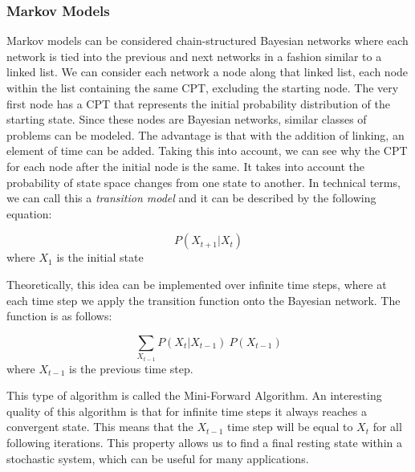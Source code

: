 \subsubsection{Markov Models}
Markov models can be considered chain-structured Bayesian networks where each network is tied into the previous and next networks in a fashion similar to a linked list. We can consider each network a node along that linked list, each node within the list containing the same CPT, excluding the starting node. The very first node has a CPT that represents the initial probability distribution of the starting state. Since these nodes are Bayesian networks, similar classes of problems can be modeled. The advantage is that with the addition of linking, an element of time can be added. Taking this into account, we can see why the CPT for each node after the initial node is the same. It takes into account the probability of state space changes from one state to another. In technical terms, we can call this a \textit{transition model} and it can be described by the following equation:\par

\vspace{-32px}
\begin{center}
  \begin{equation}
    P(X_{t+1}|X_{t})
  \end{equation}
  where $X_{1}$ is the initial state
\end{center}

Theoretically, this idea can be implemented over infinite time steps, where at each time step we apply the transition function onto the Bayesian network. The function is as follows:\par

\vspace{-32px}
\begin{center}
  \begin{equation}
    \sum_{X_{t-1}} P(X_{t}|X_{t-1})\:P(X_{t-1})
  \end{equation}
  where $X_{t-1}$ is the previous time step.
\end{center}

This type of algorithm is called the Mini-Forward Algorithm. An interesting quality of this algorithm is that for infinite time steps it always reaches a convergent state. This means that the $X_{t-1}$ time step will be equal to $X_{t}$ for all following iterations. This property allows us to find a final resting state within a stochastic system, which can be useful for many applications.

